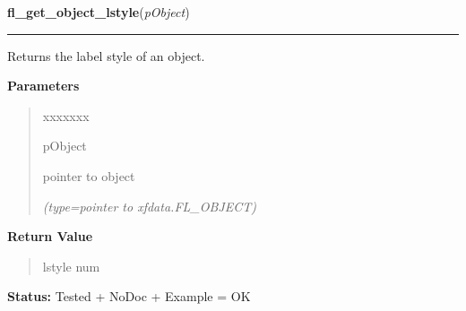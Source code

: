 \hspace{.8\funcindent}\begin{boxedminipage}{\funcwidth}

    \raggedright \textbf{fl\_get\_object\_lstyle}(\textit{pObject})

    \vspace{-1.5ex}

    \rule{\textwidth}{0.5\fboxrule}
\setlength{\parskip}{2ex}
    Returns the label style of an object.

\setlength{\parskip}{1ex}
      \textbf{Parameters}
      \vspace{-1ex}

      \begin{quote}
        \begin{Ventry}{xxxxxxx}

          \item[pObject]

          pointer to object

            {\it (type=pointer to xfdata.FL\_OBJECT)}

        \end{Ventry}

      \end{quote}

      \textbf{Return Value}
    \vspace{-1ex}

      \begin{quote}
      lstyle num

      \end{quote}

\textbf{Status:} Tested + NoDoc + Example = OK



    \end{boxedminipage}

    \label{xformslib:library:fl_set_object_lcol}

    \vspace{0.5ex}

